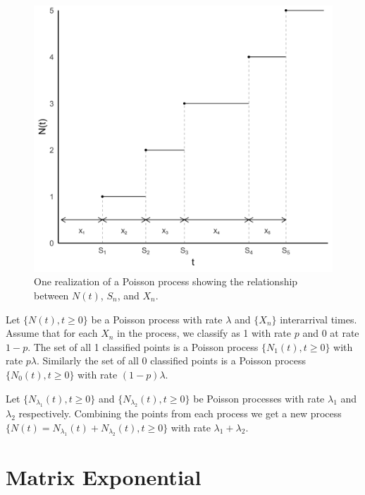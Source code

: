 \begin{figure}[H]
  \centering
    \includegraphics[width=.9\textwidth]{figures/poisson_realization.png}
   \caption{One realization of a Poisson process showing the relationship between $N(t)$, $S_n$, and $X_n$.}
  \label{fig:poisson_realization}
\end{figure}

\begin{theorem} \label{thm:poisson_thinning}
Let $\{N(t), t \geq 0\}$ be a Poisson process with rate $\lambda$ and $\{X_n\}$ interarrival times.
Assume that for each $X_n$ in the process, we classify as 1 with rate $p$ and 0 at rate $1 - p$.
The set of all 1 classified points is a Poisson process $\{N_1(t), t \geq 0\}$ with rate $p \lambda$.
Similarly the set of all 0 classified points is a Poisson process $\{N_0(t), t \geq 0\}$ with rate $(1 - p) \lambda$.
\end{theorem}

\begin{theorem} \label{thm:poisson_super}
Let $\{N_{\lambda_1}(t), t \geq 0\}$ and $\{N_{\lambda_2}(t), t \geq 0\}$ be Poisson processes with rate $\lambda_1$ and $\lambda_2$ respectively.
Combining the points from each process we get a new process $\{N(t) = N_{\lambda_1}(t) + N_{\lambda_2}(t), t \geq 0\}$ with rate $\lambda_1 + \lambda_2$.
\end{theorem}

\section{Matrix Exponential}


